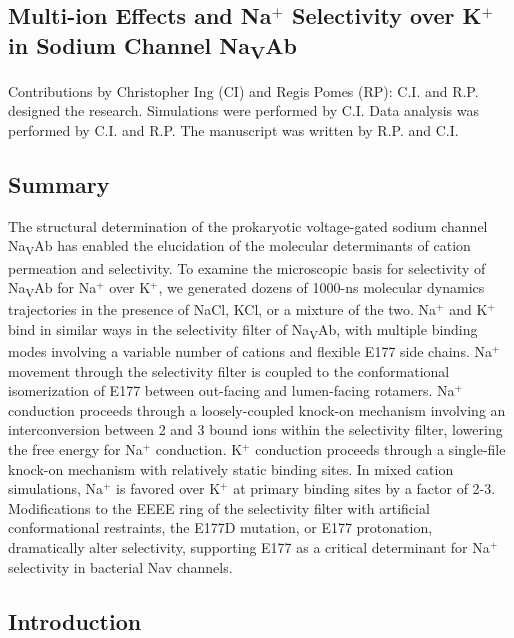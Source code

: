 \begin{refsection}
\chapter{Multi-ion Effects and Na$^+$ Selectivity over K$^+$ in Sodium Channel Na\textsubscript{V}Ab}

Contributions by Christopher Ing (CI) and Regis Pomes (RP): C.I. and R.P. designed the research. Simulations were performed by C.I. Data analysis was performed by C.I. and R.P. The manuscript was written by R.P. and C.I.

\newpage

\section{Summary}

The structural determination of the prokaryotic voltage-gated sodium channel Na\textsubscript{V}Ab has enabled the elucidation of the molecular determinants of cation permeation and selectivity.  To examine the microscopic basis for selectivity of Na\textsubscript{V}Ab for Na$^+$ over K$^+$, we generated dozens of 1000-ns molecular dynamics trajectories in the presence of NaCl, KCl, or a mixture of the two. Na$^+$ and K$^+$ bind in similar ways in the selectivity filter of Na\textsubscript{V}Ab, with multiple binding modes involving a variable number of cations and flexible E177 side chains. Na$^+$ movement through the selectivity filter is coupled to the conformational isomerization of E177 between out-facing and lumen-facing rotamers. Na$^+$ conduction proceeds through a loosely-coupled knock-on mechanism involving an interconversion between 2 and 3 bound ions within the selectivity filter, lowering the free energy for Na$^+$ conduction. K$^+$ conduction proceeds through a single-file knock-on mechanism with relatively static binding sites. In mixed cation simulations, Na$^+$ is favored over K$^+$ at primary binding sites by a factor of 2-3. Modifications to the EEEE ring of the selectivity filter with artificial conformational restraints, the E177D mutation, or E177 protonation, dramatically alter selectivity, supporting E177 as a critical determinant for Na$^+$ selectivity in bacterial Nav channels.

\section{Introduction}


\end{refsection}
